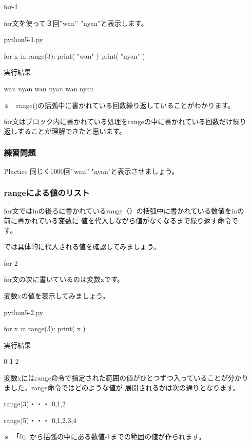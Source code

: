 \documentclass[11pt,a4paper,dvipdfmx,titlepage]{jsreport}
\begin{document}
\begin{pabox}{for-1}

for文を使って３回”wan” ”nyan”と表示します。

\begin{legbox}{python5-1.py}
\begin{listing}{1}
for x in range(3):
    print( "wan" )
    print( "nyan" )
\end{listing}
実行結果
\begin{listing}{1}
wan
nyan
wan
nyan
wan
nyan
\end{listing}
\end{legbox}


※　range()の括弧中に書かれている回数繰り返していることがわかります。
\end{pabox}

for文はブロック内に書かれている処理をrangeの中に書かれている回数だけ繰り返しすることが理解できたと思います。
\subsubsection{練習問題}
\begin{plabox}{Plactice}
同じく1000回”wan” "nyan"と表示させましょう。



\end{plabox}




\subsubsection{rangeによる値のリスト}
for文ではinの後ろに書かれているrange（）の括弧中に書かれている数値をinの前に書かれている変数に
値を代入しながら値がなくなるまで繰り返す命令です。

では具体的に代入される値を確認してみましょう。
\begin{pabox}{for-2}

for文の次に書いているのは変数xです。


変数xの値を表示してみましょう。



\begin{legbox}{python5-2.py}
\begin{listing}{1}
for x in range(3):
    print( x )
\end{listing}

実行結果
\begin{listing}{1}
0
1
2
\end{listing}
\end{legbox}
\end{pabox}
変数xにはrange命令で指定された範囲の値がひとつずつ入っていることが分かりました。range命令ではどのような値が
展開されるかは次の通りとなります。
\begin{description}
\item range(3)・・・ 0,1,2
\item range(5)・・・ 0,1,2,3,4
\end{description}
※　「0」から括弧の中にある数値-1までの範囲の値が作られます。
\end{document}
